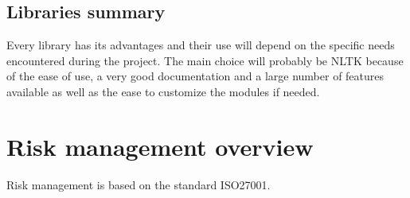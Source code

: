 \documentclass[12pt,journal,compsoc]{IEEEtran}
\begin{document}
\subsection{Libraries summary}
Every library has its advantages and their use will depend on the specific needs encountered during the project. The main choice will probably be NLTK because of the ease of use, a very good documentation and a large number of features available as well as the ease to customize the modules if needed.
\section{Risk management overview}
Risk management is based on the standard ISO27001. \cite{iso}
\end{document}
